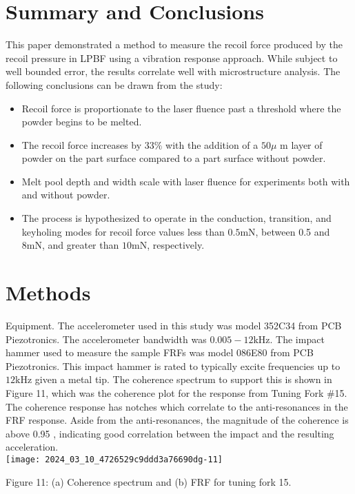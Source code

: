 \documentclass[10pt]{article}
\begin{document}
\section*{Summary and Conclusions}
This paper demonstrated a method to measure the recoil force produced by the recoil pressure in LPBF using a vibration response approach. While subject to well bounded error, the results correlate well with microstructure analysis. The following conclusions can be drawn from the study:

\begin{itemize}
  \item Recoil force is proportionate to the laser fluence past a threshold where the powder begins to be melted.
  \item The recoil force increases by $33 \%$ with the addition of a $50 \mu$ m layer of powder on the part surface compared to a part surface without powder.
  \item Melt pool depth and width scale with laser fluence for experiments both with and without powder.
  \item The process is hypothesized to operate in the conduction, transition, and keyholing modes for recoil force values less than $0.5 \mathrm{mN}$, between 0.5 and $8 \mathrm{mN}$, and greater than $10 \mathrm{mN}$, respectively.
\end{itemize}

\section*{Methods}
Equipment. The accelerometer used in this study was model 352C34 from PCB Piezotronics. The accelerometer bandwidth was $0.005-12 \mathrm{kHz}$. The impact hammer used to measure the sample FRFs was model 086E80 from PCB Piezotronics. This impact hammer is rated to typically excite frequencies up to $12 \mathrm{kHz}$ given a metal tip. The coherence spectrum to support this is shown in Figure 11, which was the coherence plot for the response from Tuning Fork \#15. The coherence response has notches which correlate to the anti-resonances in the FRF response. Aside from the anti-resonances, the magnitude of the coherence is above 0.95 , indicating good correlation between the impact and the resulting acceleration.\\
\texttt{[image: 2024\_03\_10\_4726529c9ddd3a76690dg-11]}

Figure 11: (a) Coherence spectrum and (b) FRF for tuning fork 15.
\end{document}
